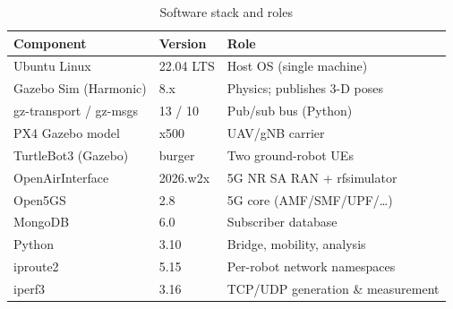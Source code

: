 \documentclass[10pt, conference]{IEEEtran}
\begin{document}
\begin{table}[t]
\caption{Software stack and roles}
\label{tab:software}
\centering
\footnotesize
\begin{tabular}{@{}lll@{}}
\toprule
\textbf{Component} & \textbf{Version} & \textbf{Role} \\
\midrule
Ubuntu Linux & 22.04 LTS & Host OS (single machine) \\
Gazebo Sim (Harmonic) & 8.x & Physics; publishes 3-D poses \\
gz-transport / gz-msgs & 13 / 10 & Pub/sub bus (Python) \\
PX4 Gazebo model & x500 & UAV/gNB carrier \\
TurtleBot3 (Gazebo) & burger & Two ground-robot UEs \\
OpenAirInterface & 2026.w2x & 5G NR SA RAN + rfsimulator \\
Open5GS & 2.8 & 5G core (AMF/SMF/UPF/\ldots) \\
MongoDB & 6.0 & Subscriber database \\
Python & 3.10 & Bridge, mobility, analysis \\
iproute2 & 5.15 & Per-robot network namespaces \\
iperf3 & 3.16 & TCP/UDP generation \& measurement \\
\bottomrule
\end{tabular}
\end{table}
\end{document}
